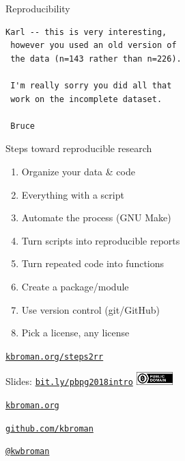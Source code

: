 \documentclass[12pt,t]{beamer}
\begin{document}
\begin{frame}[fragile,c]{Reproducibility}

\begin{center}
\begin{minipage}[c]{9.3cm}
\begin{semiverbatim}
\lstset{basicstyle=\normalsize}
\begin{lstlisting}[linewidth=9.3cm]
 Karl -- this is very interesting,
 however you used an old version of
 the data (n=143 rather than n=226).

 I'm really sorry you did all that
 work on the incomplete dataset.

 Bruce
\end{lstlisting}
\end{semiverbatim}
\end{minipage}
\end{center}

\end{frame}


\begin{frame}[c]{Steps toward reproducible research}

  \vspace{5mm}

  \begin{enumerate}
  \itemsep10pt
  \item Organize your data \& code
  \item Everything with a script
  \item Automate the process {\lolit (GNU Make)}
  \item Turn scripts into reproducible reports
  \item Turn repeated code into functions
  \item Create a package/module
  \item Use version control {\lolit (git/GitHub)}
  \item Pick a license, any license
  \end{enumerate}

\hfill \href{http://kbroman.org/steps2rr}{\scriptsize \color{lolit} \tt kbroman.org/steps2rr}

\end{frame}



\begin{frame}[c]{}

Slides: \href{http://bit.ly/pbpg2018intro}{\tt bit.ly/pbpg2018intro} \quad
\includegraphics[height=5mm]{Figs/cc-zero.png}

\vspace{7mm}

\href{http://kbroman.org}{\tt \lolit kbroman.org}

\vspace{7mm}

\href{https://github.com/kbroman}{\tt \lolit github.com/kbroman}

\vspace{7mm}

\href{https://twitter.com/kwbroman}{\tt \lolit @kwbroman}


\end{frame}
\end{document}
